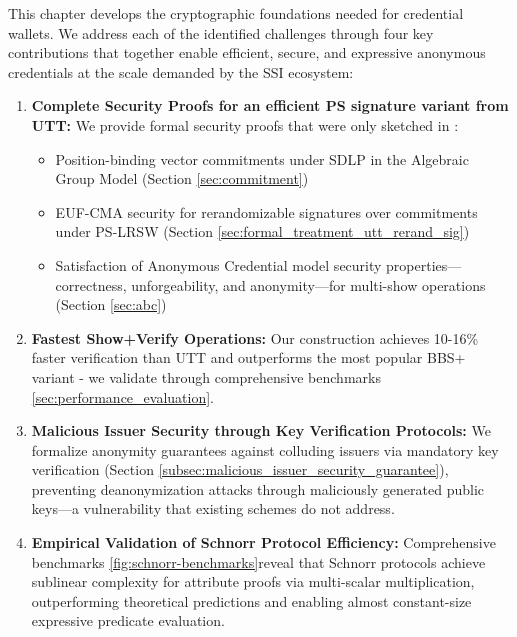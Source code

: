 This chapter develops the cryptographic foundations needed for credential wallets. We address each of the identified challenges through four key contributions that together enable efficient, secure, and expressive anonymous credentials at the scale demanded by the SSI ecosystem:

\begin{enumerate}
    \item \textbf{Complete Security Proofs for an efficient PS signature variant from UTT:} We provide formal security proofs that were only sketched in \cite{tomescu_utt_2022}:
    \begin{itemize}
        \item Position-binding vector commitments under SDLP in the Algebraic Group Model (Section \ref{sec:commitment})
        \item EUF-CMA security for rerandomizable signatures over commitments under PS-LRSW (Section \ref{sec:formal_treatment_utt_rerand_sig})
        \item Satisfaction of Anonymous Credential model \cite{fuchsbauer_structure-preserving_2019} security properties—correctness, unforgeability, and anonymity—for multi-show operations (Section \ref{sec:abc})
    \end{itemize}

    \item \textbf{Fastest Show+Verify Operations:} Our construction achieves 10-16\% faster verification than UTT \cite{tomescu_utt_2022} and outperforms the most popular BBS+ variant \cite{camenisch_anonymous_2016} - we validate through comprehensive benchmarks \ref{sec:performance_evaluation}.

    \item \textbf{Malicious Issuer Security through Key Verification Protocols:} We formalize anonymity guarantees against colluding issuers via mandatory key verification (Section \ref{subsec:malicious_issuer_security_guarantee}), preventing deanonymization attacks through maliciously generated public keys—a vulnerability that existing schemes do not address.

    \item \textbf{Empirical Validation of Schnorr Protocol Efficiency:} Comprehensive benchmarks \ref{fig:schnorr-benchmarks}reveal that Schnorr protocols achieve sublinear complexity for attribute proofs via multi-scalar multiplication, outperforming theoretical predictions and enabling almost constant-size expressive predicate evaluation.
\end{enumerate}

